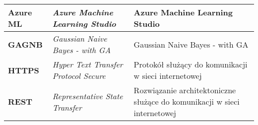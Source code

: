 \begin{table}[H]
\begin{tabularx}{\linewidth}{lXX}
        \textbf{Azure ML} & \textit{Azure Machine Learning Studio} & Azure Machine Learning Studio \\ \hline
        \textbf{GAGNB} & \textit{Gaussian Naive Bayes - with GA} & Gaussian Naive Bayes - with GA\\ \hline
        \textbf{HTTPS} & \textit{Hyper Text Transfer Protocol Secure} & Protokół służący do komunikacji w sieci internetowej \\ \hline
        \textbf{REST} & \textit{Representative State Transfer} & Rozwiązanie architektoniczne służące do komunikacji w sieci internetowej \\ \hline
    \end{tabularx}
    \label{tab:shorts}
\end{table}